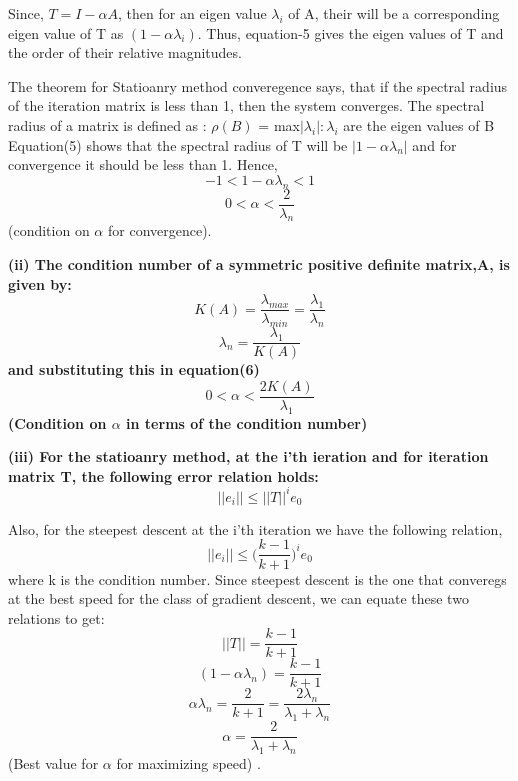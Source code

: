 \documentclass{article}
\begin{document}
 Since, $T = I - \alpha A$, then for an eigen value $\lambda_i$ of A, their will be a corresponding eigen value of T as $(1 - \alpha \lambda_i)$. Thus, equation-5 gives the eigen values of T and the order of their relative magnitudes. \newline

 The theorem for Statioanry method converegence says, that if the spectral radius of the iteration matrix is less than 1, then the system converges. The spectral radius of a matrix is defined as : \newline
 $\rho (B)$ = max{$|\lambda_i|: \lambda_i$ are the eigen values of B} \newline
 Equation(5) shows that the spectral radius of T will be $|1 - \alpha \lambda_n|$ and for convergence it should be less than 1. Hence, \newline
 \[-1 < 1 - \alpha \lambda_n < 1\]
 \begin{equation}
  0 < \alpha < \dfrac{2}{\lambda_n}
 \end{equation}
 (condition on $\alpha$ for convergence).


  \bf {(ii)} The condition number of a symmetric positive definite matrix,A, is given by: \newline
  \[K(A) = \dfrac{\lambda_{max}}{\lambda_{min}} = \dfrac{\lambda_1}{\lambda_n}\]
  \[ \lambda_n = \dfrac{\lambda_1}{K(A)}\]
  and substituting this in equation(6) \newline
  \begin{equation}
	  0 < \alpha < \dfrac{2K(A)}{\lambda_1}
  \end{equation}
  (Condition on $\alpha$ in terms of the condition number) \newline

  \bf {(iii)} For the statioanry method, at the i'th ieration and for iteration matrix T, the following error relation holds: \newline
  \[ ||e_i|| \leq ||T||^i e_0\]

  Also, for the steepest descent at the i'th iteration we have the following relation,
  \[ ||e_i|| \leq \bigg ( \dfrac{k-1}{k+1} \bigg )^i e_0\]
  where k is the condition number. Since steepest descent is the one that converegs at the best speed for the class of gradient descent, we can equate these two relations to get: \newline
  \[ ||T|| = \dfrac{k-1}{k+1}\]
  \[ (1-\alpha \lambda_n) = \dfrac{k-1}{k+1}\]
  \[ \alpha \lambda_n = \dfrac{2}{k+1} = \dfrac{2\lambda_n}{\lambda_1 + \lambda_n}\]
  \[ \alpha = \dfrac{2}{\lambda_1 + \lambda_n}\]
  (Best value for $\alpha$ for maximizing speed) . \newline
\end{document}
